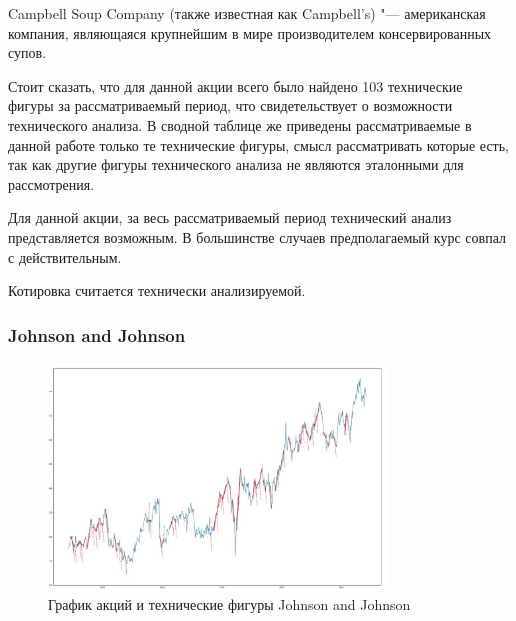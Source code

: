 \documentclass[bachelor, och, coursework]{SCWorks}
\begin{document}
    
    Campbell Soup Company (также известная как Campbell's) "--- американская 
    компания, являющаяся крупнейшим в мире производителем консервированных 
    супов.
    
    Стоит сказать, что для данной акции всего было найдено 103 технические
    фигуры за рассматриваемый период, что свидетельствует о возможности
    технического анализа. В сводной таблице же приведены рассматриваемые в 
    данной работе только те технические фигуры, смысл рассматривать которые
    есть, так как другие фигуры технического анализа не являются эталонными
    для рассмотрения.
    
    Для данной акции, за весь рассматриваемый период технический анализ 
    представляется возможным. В большинстве случаев предполагаемый курс совпал с 
    действительным.
    
    Котировка считается технически анализируемой.

    \subsubsection{Johnson and Johnson}
    
    \begin{figure}[H]
        \centering
        \includegraphics[width=0.8\textwidth]{pic/JNJ.jpg}
        \caption{График акций и технические фигуры Johnson and Johnson}
    \end{figure}
   
\end{document}
